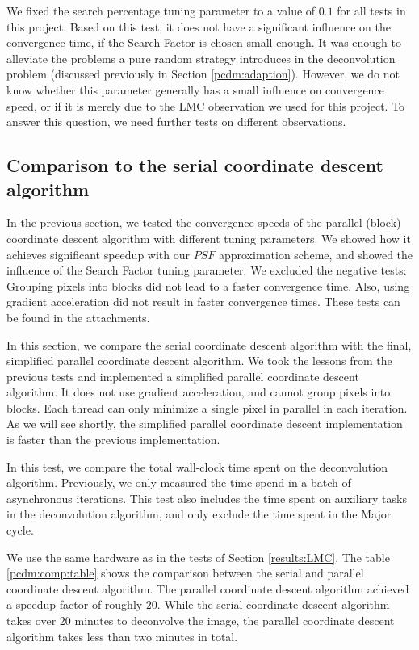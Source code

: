 We fixed the search percentage tuning parameter to a value of $0.1$ for all tests in this project. Based on this test, it does not have a significant influence on the convergence time, if the Search Factor is chosen small enough. It was enough to alleviate the problems a pure random strategy introduces in the deconvolution problem (discussed previously in Section \ref{pcdm:adaption}). However, we do not know whether this parameter generally has a small influence on convergence speed, or if it is merely due to the LMC observation we used for this project. To answer this question, we need further tests on different observations.


\subsection{Comparison to the serial coordinate descent algorithm}
In the previous section, we tested the convergence speeds of the parallel (block) coordinate descent algorithm with different tuning parameters. We showed how it achieves significant speedup with our $PSF$ approximation scheme, and showed the influence of the Search Factor tuning parameter. We excluded the negative tests: Grouping pixels into blocks did not lead to a faster convergence time. Also, using gradient acceleration \cite{fercoq2015accelerated} did not result in faster convergence times. These tests can be found in the attachments.

In this section, we compare the serial coordinate descent algorithm with the final, simplified parallel coordinate descent algorithm. We took the lessons from the previous tests and implemented a simplified parallel coordinate descent algorithm. It does not use gradient acceleration, and cannot group pixels into blocks. Each thread can only minimize a single pixel in parallel in each iteration. As we will see shortly, the simplified parallel coordinate descent implementation is faster than the previous implementation.

In this test, we compare the total wall-clock time spent on the deconvolution algorithm. Previously, we only measured the time spend in a batch of asynchronous iterations. This test also includes the time spent on auxiliary tasks in the deconvolution algorithm, and only exclude the time spent in the Major cycle.

We use the same hardware as in the tests of Section \ref{results:LMC}. The table \ref{pcdm:comp:table} shows the comparison between the serial and parallel coordinate descent algorithm. The parallel coordinate descent algorithm achieved a speedup factor of roughly $20$. While the serial coordinate descent algorithm takes over 20 minutes to deconvolve the image, the parallel coordinate descent algorithm takes less than two minutes in total.

